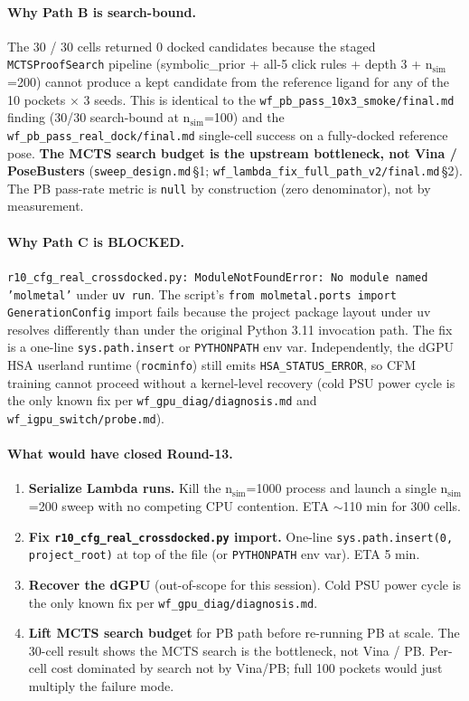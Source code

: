 {\paragraph{Why Path B is search-bound.}
The 30 / 30 cells returned 0 docked candidates because the staged
\texttt{MCTSProofSearch} pipeline (symbolic\_prior + all-5 click
rules + depth 3 + n$_{\text{sim}}${=}200) cannot produce a kept
candidate from the reference ligand for any of the 10 pockets
$\times$ 3 seeds. This is identical to the
\texttt{wf\_pb\_pass\_10x3\_smoke/final.md} finding (30/30 search-bound
at n$_{\text{sim}}${=}100) and the \texttt{wf\_pb\_pass\_real\_dock/final.md}
single-cell success on a fully-docked reference pose. \textbf{The
MCTS search budget is the upstream bottleneck, not Vina / PoseBusters}
(\texttt{sweep\_design.md}\,\S1; \texttt{wf\_lambda\_fix\_full\_path\_v2/final.md}\,\S2).
The PB pass-rate metric is \texttt{null} by construction (zero
denominator), not by measurement.

\paragraph{Why Path C is BLOCKED.}
\texttt{r10\_cfg\_real\_crossdocked.py: ModuleNotFoundError:
No module named 'molmetal'} under \texttt{uv run}. The script's
\texttt{from molmetal.ports import GenerationConfig} import fails
because the project package layout under uv resolves differently
than under the original Python 3.11 invocation path. The fix is a
one-line \texttt{sys.path.insert} or \texttt{PYTHONPATH} env var.
Independently, the dGPU HSA userland runtime (\texttt{rocminfo})
still emits \texttt{HSA\_STATUS\_ERROR}, so CFM training cannot
proceed without a kernel-level recovery (cold PSU power cycle is
the only known fix per \texttt{wf\_gpu\_diag/diagnosis.md} and
\texttt{wf\_igpu\_switch/probe.md}).

\paragraph{What would have closed Round-13.}
\begin{enumerate}
  \item \textbf{Serialize Lambda runs.} Kill the n$_{\text{sim}}${=}1000
        process and launch a single n$_{\text{sim}}${=}200 sweep
        with no competing CPU contention. ETA $\sim$110 min for 300 cells.
  \item \textbf{Fix \texttt{r10\_cfg\_real\_crossdocked.py} import.}
        One-line \texttt{sys.path.insert(0, project\_root)} at top
        of the file (or \texttt{PYTHONPATH} env var). ETA 5 min.
  \item \textbf{Recover the dGPU} (out-of-scope for this session).
        Cold PSU power cycle is the only known fix per
        \texttt{wf\_gpu\_diag/diagnosis.md}.
  \item \textbf{Lift MCTS search budget} for PB path before re-running
        PB at scale. The 30-cell result shows the MCTS search is the
        bottleneck, not Vina / PB. Per-cell cost dominated by search
        not by Vina/PB; full 100 pockets would just multiply the
        failure mode.
\end{enumerate}

}

